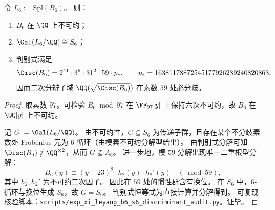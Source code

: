 \begin{theorem}[六次商多项式的满对称伽罗瓦群与敏感素数 \(59\)]\label{thm:xi-leyang-b6-galois-s6}
令 \(L_6:=\mathrm{Spl}(B_6)\)。
则：
\begin{enumerate}
  \item \(B_6\) 在 \(\QQ\) 上不可约；
  \item \(\Gal(L_6/\QQ)\cong S_6\)；
  \item 判别式满足
  \[
  \Disc(B_6)=2^{41}\cdot 3^{9}\cdot 31^{2}\cdot 59\cdot p_\ast,
  \qquad
  p_\ast=16381178872545177926239240820863,
  \]
  因而二次分辨子域 \(\QQ(\sqrt{\Disc(B_6)})\) 在素数 \(59\) 处必分歧。
\end{enumerate}
\end{theorem}
\begin{proof}
取素数 \(97\)。可检验 \(B_6\bmod 97\) 在 \(\FF_{97}[y]\) 上保持六次不可约，故 \(B_6\) 在 \(\QQ[y]\) 上不可约。
\par
记 \(G:=\Gal(L_6/\QQ)\)。
由不可约性，\(G\subseteq S_6\) 为传递子群，且存在某个不分歧素数处 Frobenius 元为 \(6\)-循环（由模素不可约分解型给出）。
由判别式分解可知 \(\Disc(B_6)\notin \QQ^{\times 2}\)，从而 \(G\nsubseteq A_6\)。
进一步地，模 \(59\) 分解出现唯一二重根型分解：
\[
B_6(y)\equiv (y-23)^2\cdot h_2(y)\cdot h_2'(y)\quad(\bmod 59),
\]
其中 \(h_2,h_2'\) 为不可约二次因子。
因此在 \(59\) 处的惯性群含有换位。
在 \(S_6\) 中，\(6\)-循环与换位生成 \(S_6\)，故 \(G=S_6\)。
判别式恒等式为直接计算并分解得到。
可复现核验脚本：\texttt{scripts/exp\_xi\_leyang\_b6\_s6\_discriminant\_audit.py}。证毕。
\end{proof}

